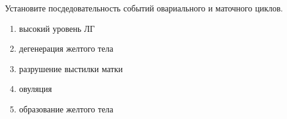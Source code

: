 Установите посдедовательность событий овариального и маточного циклов.\\
\begin{enumerate}
    \item высокий уровень ЛГ
    \item дегенерация желтого тела
    \item разрушение выстилки матки
    \item овуляция
    \item образование желтого тела
\end{enumerate}

